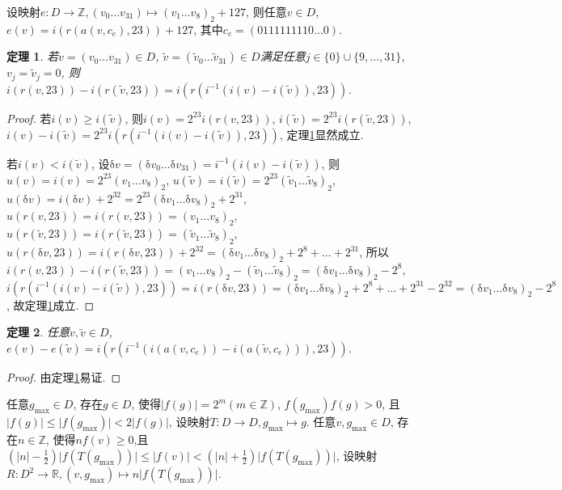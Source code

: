 \documentclass[12pt]{ctexart}
\def\m{\mapsto}
\def\ra{\rightarrow}
\newtheorem{theorem}{定理}
\begin{document}
设映射$e\!:D\ra\mathbb{Z},(v_0\dots v_{31})\m(v_1\dots v_8)_2+127$, 则任意$v\in D$, $e(v)=i(r(a(v,c_e),23))+127$, 其中$c_e=(0111111110\dots0)$.

\begin{theorem}\label{t1}
    若$v=(v_0\dots v_{31})\in D$, $\tilde{v}=(\tilde{v}_0\dots \tilde{v}_{31})\in D$满足任意$j\in\{0\}\cup\{9,\dots,31\}$, $v_j=\tilde{v}_j=0$, 则$i(r(v,23))-i(r(\tilde{v},23))=i(r(i^{-1}(i(v)-i(\tilde{v})),23))$.
\end{theorem}
\begin{proof}
    若$i(v)\geqslant i(\tilde{v})$, 则$i(v)=2^{23}i(r(v,23))$, $i(\tilde{v})=2^{23}i(r(\tilde{v},23))$, $i(v)-i(\tilde{v})=2^{23}i(r(i^{-1}(i(v)-i(\tilde{v})),23))$, 定理\ref{t1}显然成立.

    若$i(v)< i(\tilde{v})$, 设$\mathrm{\delta}v=(\mathrm{\delta}v_0\dots \mathrm{\delta}v_{31})=i^{-1}(i(v)-i(\tilde{v}))$, 则$u(v)=i(v)=2^{23}(v_1\dots v_8)_2$, $u(\tilde{v})=i(\tilde{v})=2^{23}(\tilde{v}_1\dots \tilde{v}_8)_2$, $u(\mathrm{\delta}v)=i(\mathrm{\delta}v)+2^{32}=2^{23}(\mathrm{\delta}v_1\dots \mathrm{\delta}v_8)_2+2^{31}$, $u(r(v,23))=i(r(v,23))=(v_1\dots v_8)_2$, $u(r(\tilde{v},23))=i(r(\tilde{v},23))=(\tilde{v}_1\dots \tilde{v}_8)_2$, $u(r(\mathrm{\delta}v,23))=i(r(\mathrm{\delta}v,23))+2^{32}=(\mathrm{\delta}v_1\dots \mathrm{\delta}v_8)_2+2^8+\dots+2^{31}$, 所以$i(r(v,23))-i(r(\tilde{v},23))=(v_1\dots v_8)_2-(\tilde{v}_1\dots \tilde{v}_8)_2=(\mathrm{\delta}v_1\dots \mathrm{\delta}v_8)_2-2^8$, $i(r(i^{-1}(i(v)-i(\tilde{v})),23))=i(r(\mathrm{\delta}v,23))=(\mathrm{\delta}v_1\dots \mathrm{\delta}v_8)_2+2^8+\dots+2^{31}-2^{32}=(\mathrm{\delta}v_1\dots \mathrm{\delta}v_8)_2-2^8$, 故定理\ref{t1}成立.
\end{proof}

\begin{theorem}\label{t2}
    任意$v, \tilde{v}\in D$, $e(v)-e(\tilde{v})=i(r(i^{-1}(i(a(v,c_e))-i(a(\tilde{v},c_e))),23))$.
\end{theorem}
\begin{proof}
    由定理\ref{t1}易证.
\end{proof}

任意$g_{\text{max}}\in D$, 存在$g\in D$, 使得$\vert f(g)\vert=2^m(m\in\mathbb{Z})$, $f(g_{\text{max}})f(g)>0$, 且$\vert f(g)\vert\leqslant  \vert f(g_{\text{max}})\vert<2\vert f(g)\vert$, 设映射$T\!: D\ra D, g_{\text{max}}\m g$. 任意$v,g_{\text{max}}\in D$, 存在$n\in \mathbb{Z}$, 使得$nf(v)\geqslant 0$,且$(\vert n\vert-\frac{1}{2})\vert f(T(g_{\text{max}}))\vert\leqslant \vert f(v)\vert<(\vert n\vert+\frac{1}{2})\vert f(T(g_{\text{max}}))\vert$, 设映射$R\!:D^2\ra \mathbb{R}, (v,g_{\text{max}})\m n\vert f(T(g_{\text{max}}))\vert$.
\end{document}
